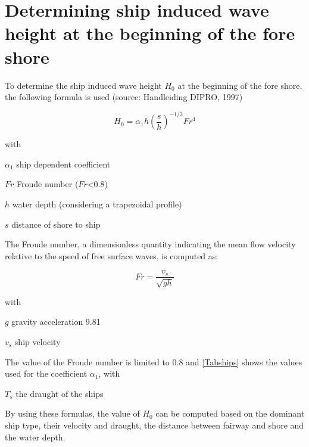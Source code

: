 \chapter{Determining ship induced wave height at the beginning of the fore shore} \label{Chp:shipwaves}

To determine the ship induced wave height $H_0$  at the beginning of the fore shore, the following formula is used (source: Handleiding DIPRO, 1997)

\begin{equation}
H_0 = \alpha_1 h \left ( \frac{s}{h} \right )^{-1/3} Fr^4
\end{equation}

with

\begin{symbollist}
\item[$\alpha_1$] ship dependent coefficient \unitbrackets{-}
\item[$Fr$] Froude number ($Fr$<0.8) \unitbrackets{-}
\item[$h$] water depth (considering a  trapezoidal profile) 
\item[$s$] distance of shore to ship 
\end{symbollist}

The Froude number, a dimensionless quantity indicating the mean flow velocity relative to the speed of free surface waves, is computed as:

\begin{equation}
Fr = \frac{v_s}{\sqrt{g h}}
\end{equation}

with

\begin{symbollist}
\item[$g$] gravity acceleration 9.81 
\item[$v_s$] ship velocity 
\end{symbollist}

The value of the Froude number is limited to 0.8 and \autoref{Tabships} shows the values used for the coefficient $\alpha_1$, with 
\begin{symbollist}
\item[$T_s$]  the draught of the ships 
\end{symbollist}


By using these formulas, the value of $H_0$ can be computed based on the dominant ship type, their velocity and draught, the distance between fairway and shore and the water depth.


